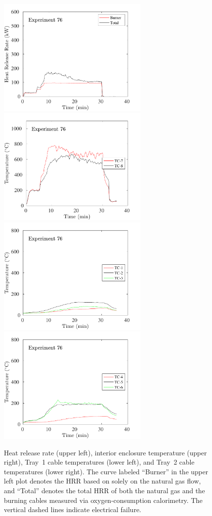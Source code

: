 \begin{figure}[H]
\includegraphics[height=2.30in]{../SCRIPT_FIGURES/Test_76_HRR} \hfill
\includegraphics[height=2.30in]{../SCRIPT_FIGURES/Test_76_TC_7-8} \\
\includegraphics[height=2.30in]{../SCRIPT_FIGURES/Test_76_TC_1-3} \hfill
\includegraphics[height=2.30in]{../SCRIPT_FIGURES/Test_76_TC_4-6}
\caption[HRR and temperatures of Experiment 76]{Heat release rate (upper left), interior enclosure temperature (upper right), Tray~1 cable temperatures (lower left), and Tray~2 cable temperatures (lower right). The curve labeled ``Burner'' in the upper left plot denotes the HRR based on solely on the natural gas flow, and ``Total'' denotes the total HRR of both the natural gas and the burning cables measured via oxygen-consumption calorimetry. The vertical dashed lines indicate electrical failure.}
\label{fig:Test_76}
\end{figure}

